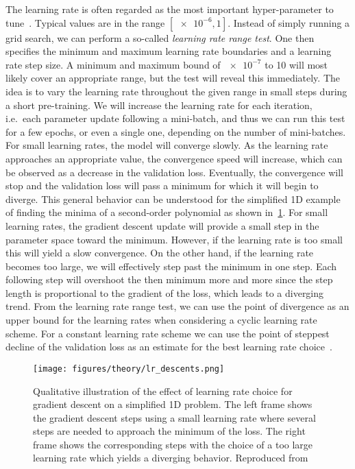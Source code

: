 The learning rate is often regarded as the most important hyper-parameter to
tune~\cite{Bengio2012}. Typical values are in the range $[\num{e-6}, 1]$.
Instead of simply running a grid search, we can perform a so-called
\textit{learning rate range test}. One then specifies the
minimum and maximum learning rate boundaries and a learning rate step size. A
minimum and maximum bound of $\num{e-7}$ to 10 will most likely cover an
appropriate range, but the test will reveal this immediately. The idea is to
vary the learning rate throughout the given range in small steps during a short
pre-training. We will increase the learning rate for each iteration, i.e.\ each
parameter update following a mini-batch, and thus we can run this test for a few
epochs, or even a single one, depending on the number of mini-batches. For small
learning rates, the model will converge slowly. As the learning rate approaches
an appropriate value, the convergence speed will increase, which can be observed
as a decrease in the validation loss. Eventually, the convergence will stop and
the validation loss will pass a minimum for which it will begin to diverge. This
general behavior can be understood for the simplified 1D example of finding the
minima of a second-order polynomial as shown in~\cref{fig:lr_descents}. For
small learning rates, the gradient descent update will provide a small step in
the parameter space toward the minimum. However, if the learning rate is too
small this will yield a slow convergence. On the other hand, if the learning
rate becomes too large, we will effectively step past the minimum in one step.
Each following step will overshoot the then minimum more and more since the step
length is proportional to the gradient of the loss, which leads to a diverging
trend. From the learning rate range test, we can use the point of divergence as an upper bound for the learning rates when considering a cyclic learning rate scheme. For a constant learning rate scheme we can use the point of steppest decline of the validation loss as an estimate for the best learning rate choice~\cite{smith2018disciplined}.


\begin{figure}[!htb]
  \centering
  \texttt{[image: figures/theory/lr\_descents.png]}
  \caption{Qualitative illustration of the effect of learning rate choice for gradient descent on a simplified 1D problem. The left frame shows the gradient descent steps using a small learning rate where several steps are needed to approach the minimum of the loss. The right frame shows the corresponding steps with the choice of a too large learning rate which yields a diverging behavior. Reproduced from~\cite{JavaTpoint}  }
  \label{fig:lr_descents}
\end{figure}


